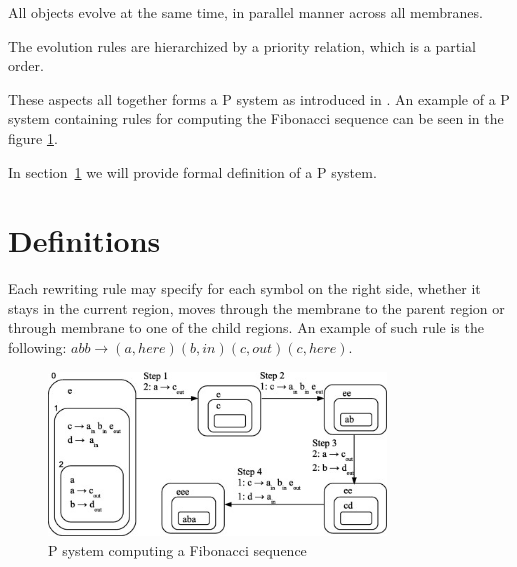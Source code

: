 \documentclass[12pt,oneside,openany,pagenumber=footcenter]{book}
\begin{document}
All objects evolve at the same time, in parallel manner across all membranes.


The evolution rules are hierarchized by a priority relation, which is a partial order.


These aspects all together forms a P system as introduced in \cite{Paun98}. An example of a P system containing rules for computing the Fibonacci sequence can be seen in the figure \ref{fig:p_system_fibonacci}.


In section~\ref{sec:definitions} we will provide formal definition of a P system.

\section{Definitions} %
\label{sec:definitions}




Each rewriting rule may specify for each symbol on the right side, whether it stays in the current region, moves through the membrane to the parent region or through membrane to one of the child regions. An example of such rule is the following: $abb\rightarrow (a,here)(b,in)(c,out)(c,here)$.










\begin{figure}[h]
  \centering
  \includegraphics[width=0.8\textwidth]{img/p_system_fibonacci.jpg}
  \caption{P system computing a Fibonacci sequence \cite{Buiu201233PSystemFibonacci}}
  \label{fig:p_system_fibonacci}
\end{figure}
\end{document}

